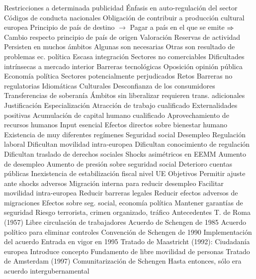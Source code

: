 \documentclass{nuevotema}
\begin{document}
\begin{esquemal}
				\4 Restricciones a determinada publicidad
				\4 Énfasis en auto-regulación del sector
				\4[] Códigos de conducta nacionales
				\4 Obligación de contribuir a producción cultural europea
				\4[] Principio de país de destino
				\4[] $\to$ Pagar a país en el que se emite
				\4[] $\then$ Cambio respecto principio de país de origen
		\2 Valoración
			\3 Reservas de actividad
				\4 Persisten en muchos ámbitos
				\4 Algunas son necesarias
				\4 Otras son resultado de problemas ec. política
			\3 Escasa integración
				\4 Sectores no comerciables
				\4[] Dificultades intrínsecas a mercado interior
				\4[] Barreras tecnológicas
			\3 Oposición opinión pública
				\4 Economía política
				\4 Sectores potencialmente perjudicados
		\2 Retos
			\3 Barreras no regulatorias
				\4 Idiomáticas
				\4 Culturales
				\4 Desconfianza de los consumidores
			\3 Transferencias de soberanía
				\4 Ámbitos sin liberalizar requieren trans. adicionales
	\1 
		\2 Justificación
			\3 Especialización
				\4 Atracción de trabajo cualificado
				\4 Externalidades positivas
				\4[$\then$] Acumulación de capital humano cualificado
			\3 Aprovechamiento de recursos humanos
				\4 Input esencial
				\4 Efectos directos sobre bienestar humano
			\3 Existencia de muy diferentes regímenes
				\4 Seguridad social
				\4 Desempleo
				\4 Regulación laboral
				\4[$\then$] Dificultan movilidad intra-europea
				\4[] Dificultan conocimiento de regulación
				\4[] Dificultan traslado de derechos sociales
			\3 Shocks asimétricos en EEMM
				\4 Aumento de desempleo
				\4 Aumento de presión sobre seguridad social
				\4 Deterioro cuentas públicas
				\4 Inexistencia de estabilización fiscal nivel UE
		\2 Objetivos
			\3 Permitir ajuste ante shocks adversos
				\4 Migración interna para reducir desempleo
			\3 Facilitar movilidad intra-europea
				\4 Reducir barreras legales
			\3 Reducir efectos adversos de migraciones
				\4 Efectos sobre seg. social, economía política
			\3 Mantener garantías de seguridad
				\4 Riesgo terrorista, crimen organizado, tráfico
		\2 Antecedentes
			\3 T. de Roma (1957)
				\4 Libre circulación de trabajadores
			\3 Acuerdo de Schengen de 1985
				\4 Acuerdo político para eliminar controles
			\3 Convención de Schengen de 1990
				\4 Implementación del acuerdo
				\4 Entrada en vigor en 1995
			\3 Tratado de Maastricht (1992):
				\4 Ciudadanía europea
				\4 Introduce concepto
				\4 Fundamento de libre movilidad de personas
			\3 Tratado de Amsterdam (1997)
				\4 Comunitarización de Schengen
				\4 Hasta entonces, sólo era acuerdo intergubernamental

\end{esquemal}
\end{document}
